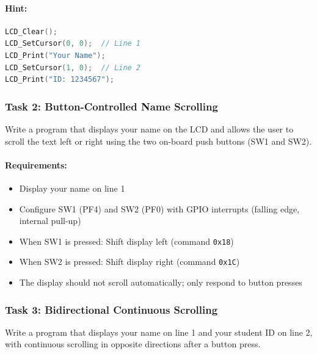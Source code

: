 \paragraph{Hint:}
\begin{lstlisting}[language=C]
LCD_Clear();
LCD_SetCursor(0, 0);  // Line 1
LCD_Print("Your Name");
LCD_SetCursor(1, 0);  // Line 2
LCD_Print("ID: 1234567");
\end{lstlisting}

\subsubsection{Task 2: Button-Controlled Name Scrolling}

Write a program that displays your name on the LCD and allows the user to scroll the text left or right using the two on-board push buttons (SW1 and SW2).

\paragraph{Requirements:}
\begin{itemize}[nosep]
  \item Display your name on line 1
  \item Configure SW1 (PF4) and SW2 (PF0) with GPIO interrupts (falling edge, internal pull-up)
  \item When SW1 is pressed: Shift display left (command \texttt{0x18})
  \item When SW2 is pressed: Shift display right (command \texttt{0x1C})
  \item The display should not scroll automatically; only respond to button presses
\end{itemize}


\subsubsection{Task 3: Bidirectional Continuous Scrolling}

Write a program that displays your name on line 1 and your student ID on line 2, with continuous scrolling in opposite directions after a button press.

